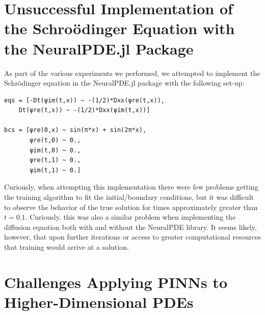 \documentclass[11pt]{article}
\newcommand{\1}{\mathbf 1}
\begin{document}







	\section{Unsuccessful Implementation of the Schro\"odinger Equation with the NeuralPDE.jl Package}

As part of the various experiments we performed, we attempted to implement the Schr\"odinger equation in the NeuralPDE.jl package with the following set-up:
\begin{singlespace}
\begin{verbatim}
eqs = [-Dt(ψim(t,x)) ~ -(1/2)*Dxx(ψre(t,x)),
	Dt(ψre(t,x)) ~ -(1/2)*Dxx(ψim(t,x))]

bcs = [ψre(0,x) ~ sin(π*x) + sin(2π*x),
       ψre(t,0) ~ 0.,
       ψim(t,0) ~ 0.,
       ψre(t,1) ~ 0.,
       ψim(t,1) ~ 0.]
\end{verbatim}
\end{singlespace}
Curiously, when attempting this implementation there were few problems getting the training algorithm to fit the initial/boundary conditions, but it was difficult to observe the behavior of the true solution for times approximately greater than $t = 0.1$.
Curiously, this was also a similar problem when implementing the diffusion equation both with and without the NeuralPDE library.
It seems likely, however, that upon further iterations or access to greater computational resources that training would arrive at a solution.

\section{Challenges Applying PINNs to Higher-Dimensional PDEs}
\end{document}
